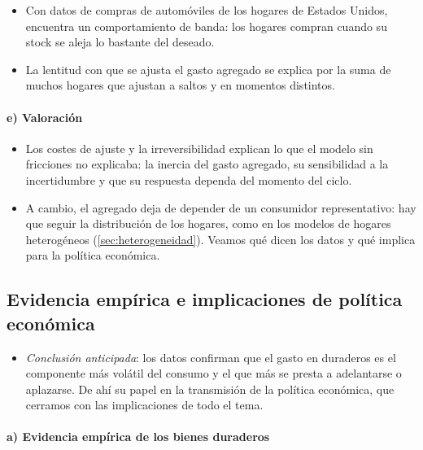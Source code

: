\documentclass[11pt]{article}
\begin{document}
\begin{itemize}
\item Con datos de compras de automóviles de los hogares de Estados Unidos, \textcite{Eberly1994Adjustment} encuentra un comportamiento de banda: los hogares compran cuando su stock se aleja lo bastante del deseado.
\item La lentitud con que se ajusta el gasto agregado se explica por la suma de muchos hogares que ajustan a saltos y en momentos distintos\nocite{Caballero1993Durable}.
\end{itemize}

\paragraph{e) Valoración}

\begin{itemize}
\item Los costes de ajuste y la irreversibilidad explican lo que el modelo sin fricciones no explicaba: la inercia del gasto agregado, su sensibilidad a la incertidumbre y que su respuesta dependa del momento del ciclo.
\item A cambio, el agregado deja de depender de un consumidor representativo: hay que seguir la distribución de los hogares, como en los modelos de hogares heterogéneos (\ref{sec:heterogeneidad}). Veamos qué dicen los datos y qué implica para la política económica.
\end{itemize}

\subsection{Evidencia empírica e implicaciones de política económica}\label{sec:duraderos-evidencia}

\begin{itemize}
\item \emph{Conclusión anticipada}: los datos confirman que el gasto en duraderos es el componente más volátil del consumo y el que más se presta a adelantarse o aplazarse. De ahí su papel en la transmisión de la política económica, que cerramos con las implicaciones de todo el tema.
\end{itemize}

\paragraph{a) Evidencia empírica de los bienes duraderos}
\end{document}
